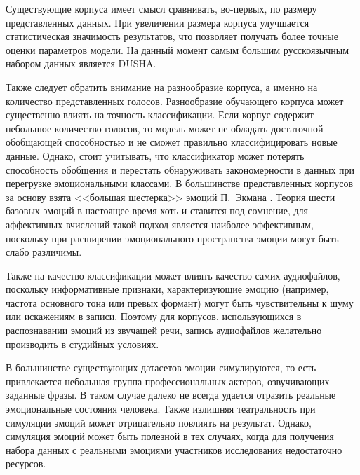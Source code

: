 Существующие корпуса имеет смысл сравнивать, во-первых, по размеру представленных данных. При увеличении размера корпуса улучшается статистическая значимость результатов, что позволяет получать более точные оценки параметров модели. На данный момент самым большим русскоязычным набором данных является DUSHA. 

Также следует обратить внимание на разнообразие корпуса, а именно на количество представленных голосов. Разнообразие обучающего корпуса может существенно влиять на точность классификации. Если корпус содержит небольшое количество голосов, то модель может не обладать достаточной обобщающей способностью и не сможет правильно классифицировать новые данные. Однако, стоит учитывать, что классификатор может потерять способность обобщения и перестать обнаруживать закономерности в данных при перегрузке эмоциональными классами. В большинстве представленных корпусов за основу взята <<большая шестерка>> эмоций П.~Экмана \cite{Ekman1972}. Теория шести базовых эмоций в настоящее время хоть и ставится под сомнение, для аффективных вчислений такой подход является наиболее эффективным, поскольку при расширении эмоционального пространства эмоции могут быть слабо различимы. 

Также на качество классификации может влиять качество самих аудиофайлов, поскольку информативные признаки, характеризующие эмоцию (например, частота основного тона или превых формант) могут быть чувствительны к шуму или искажениям в записи. Поэтому для корпусов, использующихся в распознавании эмоций из звучащей речи, запись аудиофайлов желательно производить в студийных условиях.

В большинстве существующих датасетов эмоции симулируются, то есть привлекается небольшая группа профессиональных актеров, озвучивающих заданные фразы. В таком случае далеко не всегда удается отразить реальные эмоциональные состояния человека. Также излишняя театральность при симуляции эмоций может отрицательно повлиять на результат. Однако, симуляция эмоций может быть полезной в тех случаях, когда для получения набора данных с реальными эмоциями участников исследования недостаточно ресурсов.


